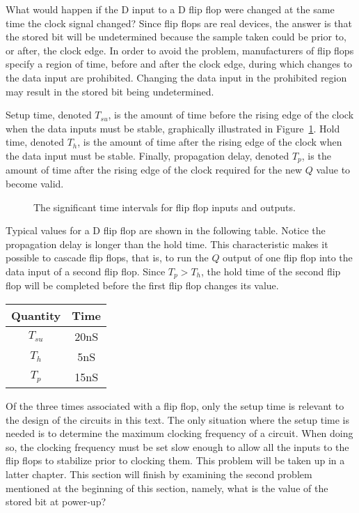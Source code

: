 What would happen if the D input to a D flip flop were changed at 
the same time the clock signal changed?  Since flip flops are
real devices, the answer is that the stored bit will be 
undetermined because the sample taken could be prior to, 
or after, the clock edge.  In order to avoid the problem,
manufacturers of flip flops specify a region of time, before and
after the clock edge, during which changes to the data input are
prohibited.  Changing the data input in the prohibited region
may result in the stored bit being undetermined.

Setup time,  \label{page:setup} denoted $T_{su}$, is the
amount of time before the rising edge of the clock when the data
inputs must be stable, graphically illustrated in 
Figure~\ref{fig:sequentialCirff-time}.  Hold time,  denoted $T_h$, 
is the amount of time after the rising edge of the clock when the data
input must be stable.  Finally, propagation delay, denoted $T_p$,
  
is the amount of time after the rising edge of the clock required for the 
new $Q$ value to become valid. 

\begin{figure}[ht]
\caption{The significant time intervals for flip flop inputs and outputs.}
\label{fig:sequentialCirff-time}
\end{figure}

Typical values for a D flip flop are shown in the following
table.  Notice the propagation delay is longer than the hold time.  
This characteristic makes it possible to cascade flip flops, that is, to 
run the $Q$ output of one flip flop into the data input of a second
flip flop.  Since $T_p > T_h$, the hold time of the second flip flop
will be completed before the first flip flop changes its value.
\label{page:FFdelay}

\begin{tabular}{c|c}
Quantity & Time \\ \hline
$T_{su}$ & 20nS  \\ \hline
$T_h$    & 5nS  \\ \hline
$T_p$    & 15nS  \\ 
\end{tabular}

Of the three times associated with a flip flop, only the setup
time is relevant to the design of the circuits in this text.
The only situation where the setup time is needed is to determine
the maximum clocking frequency of a circuit.  When doing so,
the clocking frequency must be set slow enough to allow all the
inputs to the flip flops to stabilize prior to clocking them.  This
problem will be taken up in a latter chapter.  This section will
finish by examining the second problem mentioned at the beginning
of this section, namely, what is the value of the stored bit at power-up?

